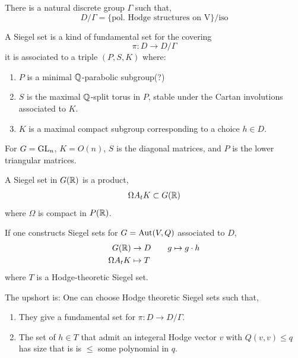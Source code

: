 \documentclass[12pt]{amsart}
\begin{document}
There is a natural discrete group $\Gamma$ such that, 
\[ D/\Gamma = \{ \text{pol. Hodge structures on V} \}/\text{iso}\]

\begin{definition}
    A Siegel set is a kind of fundamental set for the covering
    \[ \pi: D \to D/\Gamma\]
    it is associated to a triple $(P, S, K)$ where: 
    \begin{enumerate}
        \item $P$ is a minimal $\mathbb Q$-parabolic subgroup(?)
        \item $S$ is the maximal $\mathbb Q$-split torus in $P$, stable under the Cartan involutions associated to $K$.
        \item $K$ is a maximal compact subgroup corresponding to a choice $h \in D$. 
    \end{enumerate}
\end{definition}

For $G = \operatorname{GL}_n$, $K = O(n)$, $S$ is the diagonal matrices, and $P$ is the lower triangular matrices. 

A Siegel set in $G(\mathbb R)$ is a product, 
\begin{align*}
    \Omega A_t K \subset G(\mathbb R)
\end{align*}
where $\Omega$ is compact in $P(\mathbb R)$. 

If one constructs Siegel sets for $G = \operatorname{Aut}(V, Q)$ associated to $D$, 
\begin{align*}
    G(\mathbb R) &\to D \qquad g \mapsto g\cdot h \\
    \Omega A_t K &\mapsto T
\end{align*}
where $T$ is a Hodge-theoretic Siegel set. 

The upshort is: One can choose Hodge theoretic Siegel sets such that, 
\begin{enumerate}
    \item They give a fundamental set for $\pi: D \to D/\Gamma$. 
    \item The set of $h \in T$ that admit an integeral Hodge vector $v$ with $Q(v,v) \leq q$ has size that is is $\leq$ some polynomial in $q$. 
\end{enumerate}
\end{document}
